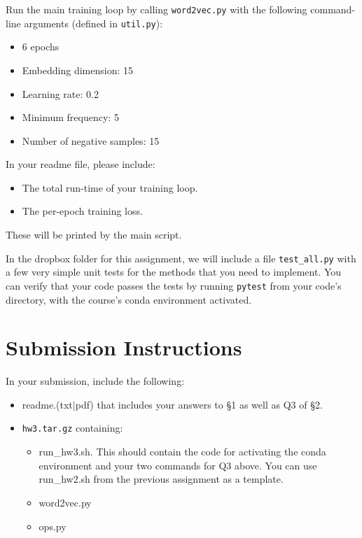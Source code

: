 \documentclass[11pt]{article}
\begin{document}
\vspace{2em}
 Run the main training loop by calling \texttt{word2vec.py} with the following command-line arguments (defined in \texttt{util.py}):
\begin{itemize}
  \item 6 epochs
  \item Embedding dimension: 15
  \item Learning rate: 0.2
  \item Minimum frequency: 5
  \item Number of negative samples: 15
\end{itemize}
In your readme file, please include: 
\begin{itemize}
  \item The total run-time of your training loop.  
  \item The per-epoch training loss. 
\end{itemize}
These will be printed by the main script.


\vspace{2em}
 In the dropbox folder for this assignment, we will include a file \texttt{test\_all.py} with a few very simple unit tests for the methods that you need to implement.  You can verify that your code passes the tests by running \texttt{pytest} from your code's directory, with the course's conda environment activated.


\section*{Submission Instructions}

In your submission, include the following:
\begin{itemize}
  \item readme.(txt$\mid$pdf) that includes your answers to \S1 as well as Q3 of \S2. 
  \item \texttt{hw3.tar.gz} containing:
  \begin{itemize}
    \item run\_hw3.sh.  This should contain the code for activating the conda environment and your two commands for Q3 above.  You can use run\_hw2.sh from the previous assignment as a template.
    \item word2vec.py
    \item ops.py
  \end{itemize}
\end{itemize}
\end{document}
